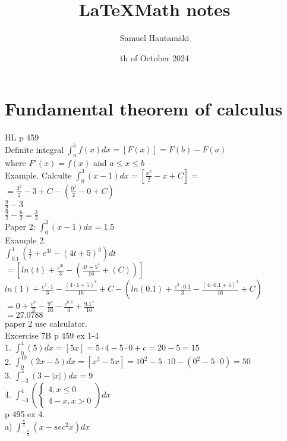 \documentclass{article}
\title{\LaTeX Math notes}
\author{Samuel Hautamäki}
\date{th of October 2024}
\begin{document}
  \maketitle
   
  \section{Fundamental theorem of calculus}
  HL p 459\\
  Definite integral $\int_{a}^{b}f(x) dx= [F(x)]=F(b)-F(a)$\\
  where $F'(x)=f(x)$ and $a\leq x\leq b$\\
  Example. Calculte $\int_{0}^{3}(x-1)dx=[\frac{x^2}{2}-x+C]=$\\
  $=\frac{3^2}{2}-3+C-(\frac{0^2}{2}-0+C)$\\
  $\frac{9}{2}-3$\\
  $\frac{9}{2}-\frac{6}{2}=\frac{3}{2}$\\
  Paper 2: $\int_{0}^{3}(x-1)dx=1.5$\\
  Example 2.\\
  $\int_{0.1}^{1}(\frac{1}{t}+e^{3t}-(4t+5)^3)dt$\\
  $=[ln(t)+\frac{e^{3t}}{3}-(\frac{4t+5^4}{16}+(C))]$\\ 
  $ln(1)+\frac{e^3\cdot1}{3}-\frac{(4\cdot1+5)^4}{16}+C-(ln(0.1)+\frac{e^3\cdot0.1}{3}-\frac{(4\cdot 0.1+5)^4}{16}+C)$\\
  $=0+\frac{e^3}{3}-\frac{9^4}{16}-\frac{e^0.3}{3}+\frac{9.1^4}{16}$\\
  $=27.0788$\\
  paper 2 use calculator.\\
  Excercise 7B p 459 ex 1-4\\
  1. $\int_{0}^{4}(5)dx=[5x]=5\cdot4-5\cdot0+c=20-5=15$\\
  2. $\int_{0}^{10}(2x-5)dx=[x^2-5x]=10^2-5\cdot10-(0^2-5\cdot0)=50$\\
  3. $\int_{-3}^{3}(3-|x|)dx=9$\\
  4. $\int_{-3}^{4}(\begin{cases}
    4, x\leq 0\\
    4-x,x>0
  \end{cases})dx$\\
  p 495 ex 4.\\
  a) $\int_{-\frac{\pi}{4}}^{\frac{\pi}{4}}(x-sec^2x)dx$\\
  

   
\end{document}
